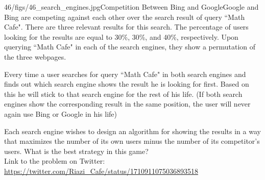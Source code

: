 \begin{problem}{46/figs/46_search_engines.jpg}{Competition Between Bing and Google}Google and Bing are competing against each other over the search result of query  ``Math Cafe". There are three relevant results for this search. The percentage of users looking for the results are equal to 30\%, 30\%, and 40\%, respectively. Upon querying ``Math Cafe" in each of the search engines, they show a permutation of the three webpages.
	
Every time a user searches for query ``Math Cafe" in both search engines and finds out which search engine shows the result he is looking for first. Based on this he will stick to that search engine for the rest of his life. (If both search engines show the corresponding result in the same position, the user will never again use Bing or Google in his life)
	
Each search engine wishes to design an algorithm for showing the results in a way that maximizes the number of its own users minus the number of its competitor's users. What is the best strategy in this game?\\[0.2cm]
	
Link to the problem on Twitter:  \url{https://twitter.com/Riazi_Cafe/status/1710911075036893518}\end{problem}